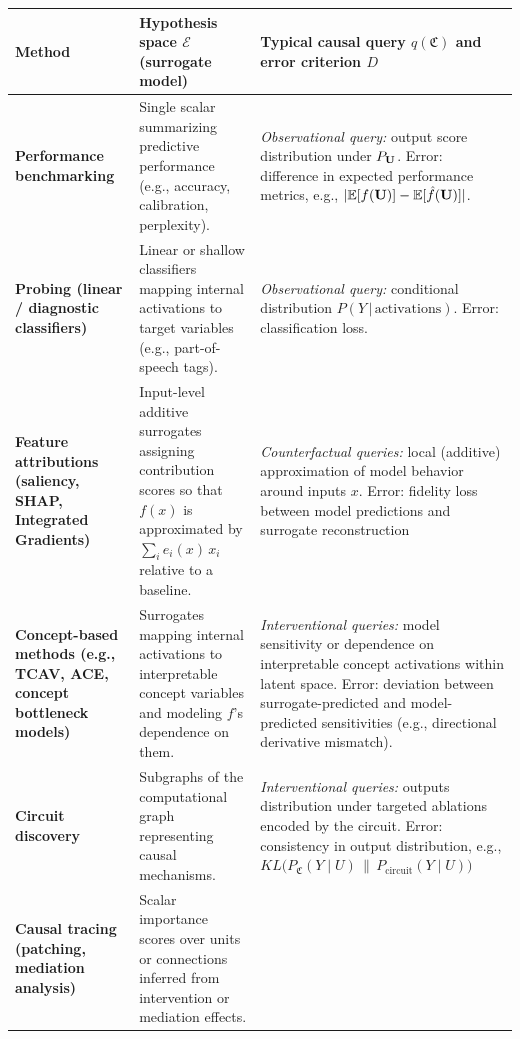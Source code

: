 \begin{table}[ht]
\centering
\renewcommand{\arraystretch}{1.25}
\begin{tabular}{@{}p{3.2cm}p{5.1cm}p{5.1cm}@{}}
\toprule
\textbf{Method} & \textbf{Hypothesis space $\mathcal{E}$ (surrogate model)} & \textbf{Typical causal query $q(\mathfrak{C})$ and error criterion $D$} \\
\midrule
\textbf{Performance benchmarking} 
& Single scalar summarizing predictive performance (e.g., accuracy, calibration, perplexity).  
& \textit{Observational query:} output score distribution under $P_{\mathbf{U}}$.  
Error: difference in expected performance metrics, e.g., $|{\mathbb E}[f(\mathbf{U})] - {\mathbb E}[\hat{f}(\mathbf{U})]|$. \\ 
\midrule
\textbf{Probing (linear / diagnostic classifiers)} 
& Linear or shallow classifiers mapping internal activations to target variables (e.g., part-of-speech tags).  
& \textit{Observational query:} conditional distribution $P(Y\,|\,\text{activations})$.  
Error: classification loss. \\ 
\midrule
\textbf{Feature attributions (saliency, SHAP, Integrated Gradients)} 
& Input-level additive surrogates assigning contribution scores so that $f(x)$ is approximated by $\sum_i e_i(x)\,x_i$ relative to a baseline.  
& \textit{Counterfactual queries:} local (additive) approximation of model behavior around inputs $x$.  
Error: fidelity loss between model predictions and surrogate reconstruction \\ 
\midrule
\textbf{Concept-based methods (e.g., TCAV, ACE, concept bottleneck models)} 
& Surrogates mapping internal activations to interpretable concept variables and modeling $f$’s dependence on them.  
& \textit{Interventional queries:} model sensitivity or dependence on interpretable concept activations within latent space.  
Error: deviation between surrogate-predicted and model-predicted sensitivities (e.g., directional derivative mismatch). \\ 
\midrule
\textbf{Circuit discovery} 
& Subgraphs of the computational graph representing causal mechanisms.  
& \textit{Interventional queries:}  outputs distribution under targeted ablations encoded by the circuit.  
Error: consistency in output distribution, e.g.,
$KL\big(P_{\mathfrak{C}}(Y \mid U) \, \| \, P_{\text{circuit}}(Y \mid U)\big)$ \\ 
\midrule
\textbf{Causal tracing (patching, mediation analysis)} 
& Scalar importance scores over units or connections inferred from intervention or mediation effects.  

\end{tabular}
\end{table}
